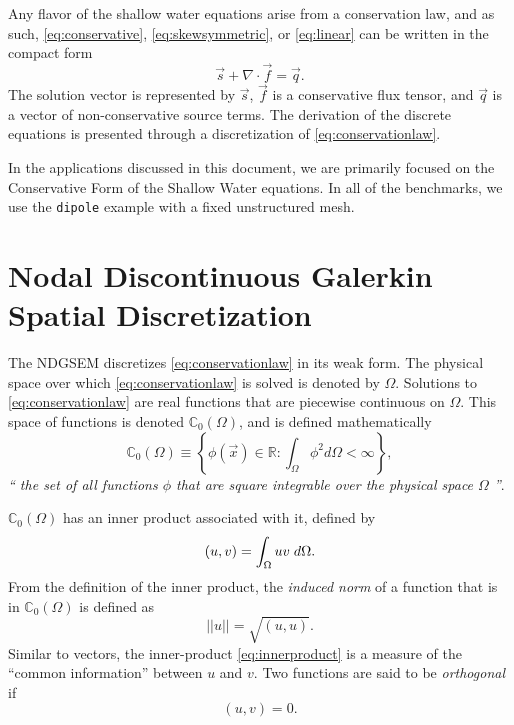 \documentclass{softwaremanual}
\begin{document}
Any flavor of the shallow water equations arise from a conservation law, and as such, \eqref{eq:conservative}, \eqref{eq:skewsymmetric}, or \eqref{eq:linear} can be written in the compact form
\begin{equation}
\vec{s} + \nabla \cdot \vec{f} = \vec{q}. \label{eq:conservationlaw}
\end{equation}
The solution vector is represented by $\vec{s}$, $\vec{f}$ is a conservative flux tensor, and $\vec{q}$ is a vector of non-conservative source terms. The derivation of the discrete equations is presented through a discretization of \eqref{eq:conservationlaw}. 

In the applications discussed in this document, we are primarily focused on the Conservative Form of the Shallow Water equations. In all of the benchmarks, we use the \texttt{dipole} example with a fixed unstructured mesh. 


\section{Nodal Discontinuous Galerkin Spatial Discretization}
The NDGSEM discretizes \eqref{eq:conservationlaw} in its weak form. The physical space over which \eqref{eq:conservationlaw} is solved is denoted by $\Omega$. Solutions to \eqref{eq:conservationlaw} are real functions that are piecewise continuous on $\Omega$. This space of functions is denoted $\mathbb{C}_0(\Omega)$, and is defined mathematically
\begin{equation}
\mathbb{C}_0(\Omega) \equiv \left\lbrace \phi(\vec{x}) \in \mathbb{R} : \int_{\Omega} \phi^2 d\Omega < \infty \right\rbrace,
\end{equation}
\textit{`` the set of all functions $\phi$ that are square integrable over the physical space $\Omega$ ''}.

$\mathbb{C}_0(\Omega)$ has an inner product associated with it, defined by
\begin{equation}
(u,v) = \int_{\Omega} uv \hspace{1mm} d\Omega. \label{eq:innerproduct}
\end{equation}
From the definition of the inner product, the \textit{induced norm} of a function that is in $\mathbb{C}_0(\Omega)$ is defined as
\begin{equation}
||u|| = \sqrt{(u,u)}.\label{eq:norm}
\end{equation}
Similar to vectors, the inner-product \eqref{eq:innerproduct} is a measure of the ``common information'' between $u$ and $v$. Two functions are said to be \textit{orthogonal} if
\begin{equation}
(u,v) = 0. \label{eq:orthogonality}
\end{equation}
\end{document}
